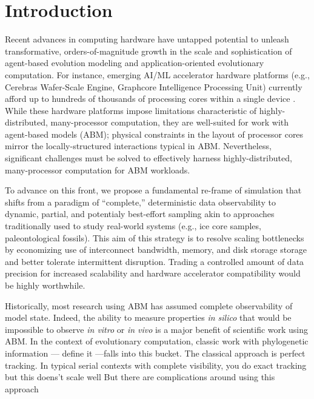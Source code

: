 \section{Introduction} \label{sec:introduction}

Recent advances in computing hardware have untapped potential to unleash transformative, orders-of-magnitude growth in the scale and sophistication of agent-based evolution modeling and application-oriented evolutionary computation.
For instance, emerging AI/ML accelerator hardware platforms (e.g., Cerebras Wafer-Scale Engine, Graphcore Intelligence Processing Unit) currently afford up to hundreds of thousands of processing cores within a single device \citep{TODO,TODO}.
While these hardware platforms impose limitations characteristic of highly-distributed, many-processor computation, they are well-suited for work with agent-based models (ABM); physical constraints in the layout of processor cores mirror the locally-structured interactions typical in ABM.
Nevertheless, significant challenges must be solved to effectively harness highly-distributed, many-processor computation for ABM workloads.

To advance on this front, we propose a fundamental re-frame of simulation that shifts from a paradigm of ``complete,'' deterministic data observability to dynamic, partial, and potentialy best-effort sampling akin to approaches traditionally used to study real-world systems (e.g., ice core samples, paleontological fossils).
This aim of this strategy is to resolve scaling bottlenecks by economizing use of interconnect bandwidth, memory, and disk storage storage and better tolerate intermittent disruption.
Trading a controlled amount of data precision for increased scalability and hardware accelerator compatibility would be highly worthwhile. 

Historically, most research using ABM has assumed complete observability of model state.
Indeed, the ability to measure properties \textit{in silico} that would be impossible to observe \textit{in vitro} or \textit{in vivo} is a major benefit of scientific work using ABM.
In the context of evolutionary computation, classic work with phylogenetic information --- define it ---falls into this bucket.
The classical approach is perfect tracking.
In typical serial contexts with complete visibility, you do exact tracking but this doens't scale well
But there are complications around using this approach \citep{moreno2024}

